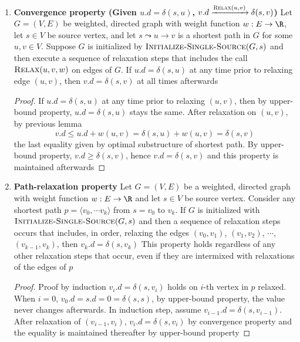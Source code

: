 \documentclass[11pt]{article}
\begin{document}
\begin{proposition*}
\begin{enumerate}
\begin{lemma*}
\begin{proof}
            \end{proof}
        \end{lemma*}
        \item \textbf{Convergence property (Given $u.d = \delta(s,u)$, $v.d
        \xrightarrow{\textsc{Relax}(u,v)} \delta(s,v)$)} Let $G = (V,E)$ be weighted, directed graph with weight function $w: E\to\R$, let $s\in V$ be source vertex, and let $s \leadsto u \to v$ is a shortest path in $G$ for some $u,v \in V$. Suppose $G$ is initialized by $\textsc{Initialize-Single-Source}(G,s)$ and then execute a sequence of relaxation steps that includes the call $\textsc{Relax}(u,v,w)$ on edges of $G$. If $u.d = \delta(s,u)$ at any time prior to relaxing edge $(u,v)$, then $v.d = \delta(s,v)$ at all times afterwards
        \begin{proof}
            If $u.d =\delta(s,u)$ at any time prior to relaxing $(u,v)$, then by upper-bound property, $u.d = \delta(s,u)$ stays the same. After relaxation on $(u,v)$, by previous lemma
            \[
                v.d \leq u.d + w(u,v) = \delta(s,u) + w(u,v) = \delta(s,v)
            \]
            the last equality given by optimal substructure of shortest path. By upper-bound property, $v.d \geq \delta(s,v)$, hence $v.d = \delta(s,v)$ and this property is maintained afterwards
        \end{proof}
        \item \textbf{Path-relaxation property} Let $G = (V,E)$ be a weighted, directed graph with weight function $w:E\to\R$ and let $s\in V$ be source vertex. Consider any shortest path $p = \langle v_0, \cdots v_k \rangle$ from $s = v_0$ to $v_k$. If $G$ is initialized with $\textsc{Initialize-Single-Source}(G,s)$ and then a sequence of relaxation steps occurs that includes, in order, relaxing the edges $(v_0, v_1)$, $(v_1, v_2)$, $\cdots$, $(v_{k-1}, v_k)$, then $v_k.d = \delta(s, v_k)$ This property holds regardless of any other relaxation steps that occur, even if they are intermixed with relaxations of the edges of $p$
        \begin{proof}
            Proof by induction $v_i.d = \delta(s,v_i)$ holds on $i$-th vertex in $p$ relaxed. When $i = 0$, $v_0.d = s.d = 0 = \delta(s,s)$, by upper-bound property, the value never changes afterwards. In induction step, assume $v_{i-1}.d = \delta(s, v_{i-1})$. After relaxation of $(v_{i-1}, v_i)$, $v_i.d = \delta(s, v_i)$ by convergence property and the equality is maintained thereafter by upper-bound property
        \end{proof}
    \end{enumerate}
\end{proposition*}
\end{document}
